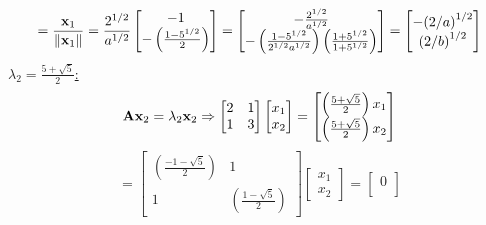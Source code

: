 \begin{enumerate}[font=\bfseries]
\[            =
            \frac{\bold{x}_1}{\left\|\bold{x}_1\right\|}
            =
            \frac{2^{1/2}}{a^{1/2}}
            \begin{bmatrix}
                -1 \\
                -\left(\frac{1 - 5^{1/2}}{2}\right)
            \end{bmatrix}
            =
            \begin{bmatrix}
                -\frac{2^{1/2}}{a^{1/2}} \\
                -\left(\frac{1 - 5^{1/2}}{2^{1/2}a^{1/2}}\right)\left(\frac{1 + 5^{1/2}}{1 + 5^{1/2}}\right)
            \end{bmatrix}
            =
            \begin{bmatrix}
                -{\left(2/a\right)}^{1/2} \\
                {\left(2/b\right)}^{1/2}
            \end{bmatrix}
        \]
        \newline
        \underline{$\lambda_2 = \frac{5 + \sqrt{5}}{2}$:}
        \[
            \bold{A}\bold{x}_2 = \lambda_2 \bold{x}_2
            \Rightarrow
            \begin{bmatrix}
                2 & 1 \\
                1 & 3
            \end{bmatrix}
            \begin{bmatrix}
                x_1 \\
                x_2
            \end{bmatrix}
            =
            \begin{bmatrix}
                \left(\frac{5 + \sqrt{5}}{2}\right)x_1 \\
                \left(\frac{5 + \sqrt{5}}{2}\right)x_2
            \end{bmatrix}
        \]
        \[
            =
            \begin{bmatrix}
                \left(\frac{-1 - \sqrt{5}}{2}\right) & 1 \\
                1 & \left(\frac{1 - \sqrt{5}}{2}\right)
            \end{bmatrix}
            \begin{bmatrix}
                x_1 \\
                x_2
            \end{bmatrix}
            =
            \begin{bmatrix}
                0 \\

\end{bmatrix}\]
\end{enumerate}
